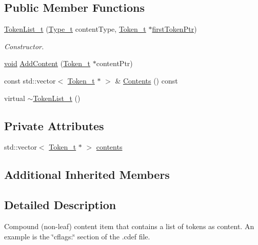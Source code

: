 \subsection*{Public Member Functions}
\begin{DoxyCompactItemize}
\item 
\hyperlink{struct_token_list__t_aad5f93916196d2eb3ef0330aa1741194}{Token\+List\+\_\+t} (\hyperlink{struct_content__t_a9ba94026278eb679d8d42d28725b0eae}{Type\+\_\+t} content\+Type, \hyperlink{struct_token__t}{Token\+\_\+t} $\ast$\hyperlink{struct_compound_item__t_a4d95dc788120f627e332491589d20c5c}{first\+Token\+Ptr})
\begin{DoxyCompactList}\small\item\em Constructor. \end{DoxyCompactList}\item 
\hyperlink{_t_e_m_p_l_a_t_e__cdef_8h_ac9c84fa68bbad002983e35ce3663c686}{void} \hyperlink{struct_token_list__t_aed35d561e8810fea3c0a21f791409cfb}{Add\+Content} (\hyperlink{struct_token__t}{Token\+\_\+t} $\ast$content\+Ptr)
\item 
const std\+::vector$<$ \hyperlink{struct_token__t}{Token\+\_\+t} $\ast$ $>$ \& \hyperlink{struct_token_list__t_a1423b1f433e6498d8a4934c66680d39e}{Contents} () const 
\item 
virtual \hyperlink{struct_token_list__t_ac510d9f37f49196fa990794810d4c332}{$\sim$\+Token\+List\+\_\+t} ()
\end{DoxyCompactItemize}
\subsection*{Private Attributes}
\begin{DoxyCompactItemize}
\item 
std\+::vector$<$ \hyperlink{struct_token__t}{Token\+\_\+t} $\ast$ $>$ \hyperlink{struct_token_list__t_a84e4c7f039e36730d0a0ff938ef6aed4}{contents}
\end{DoxyCompactItemize}
\subsection*{Additional Inherited Members}


\subsection{Detailed Description}
Compound (non-\/leaf) content item that contains a list of tokens as content. An example is the \char`\"{}cflags\+:\char`\"{} section of the .cdef file. 

